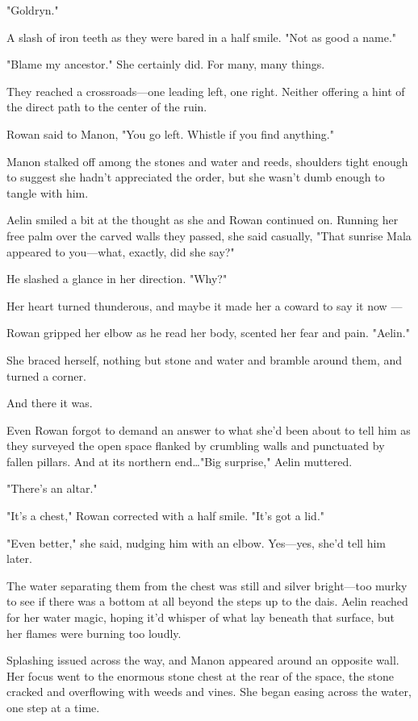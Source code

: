 "Goldryn."

A slash of iron teeth as they were bared in a half smile.
"Not as good a name."

"Blame my ancestor."
She certainly did.
For many, many things.

They reached a crossroads---one leading left, one right.
Neither offering a hint of the direct path to the center of the ruin.

Rowan said to Manon, "You go left.
Whistle if you find anything."

Manon stalked off among the stones and water and reeds, shoulders tight enough to suggest she hadn't appreciated the order, but she wasn't dumb enough to tangle with him.

Aelin smiled a bit at the thought as she and Rowan continued on.
Running her free palm over the carved walls they passed, she said casually, "That sunrise Mala appeared to you---what, exactly, did she say?"

He slashed a glance in her direction.
"Why?"

Her heart turned thunderous, and maybe it made her a coward to say it now ---

Rowan gripped her elbow as he read her body, scented her fear and pain.
"Aelin."

She braced herself, nothing but stone and water and bramble around them, and turned a corner.

And there it was.

Even Rowan forgot to demand an answer to what she'd been about to tell him as they surveyed the open space flanked by crumbling walls and punctuated by fallen pillars.
And at its northern end\ldots "Big surprise," Aelin muttered.

"There's an altar."

"It's a chest," Rowan corrected with a half smile.
"It's got a lid."

"Even better," she said, nudging him with an elbow.
Yes---yes, she'd tell him later.

The water separating them from the chest was still and silver bright---too murky to see if there was a bottom at all beyond the steps up to the dais.
Aelin reached for her water magic, hoping it'd whisper of what lay beneath that surface, but her flames were burning too loudly.

Splashing issued across the way, and Manon appeared around an opposite wall.
Her focus went to the enormous stone chest at the rear of the space, the stone cracked and overflowing with weeds and vines.
She began easing across the water, one step at a time.

